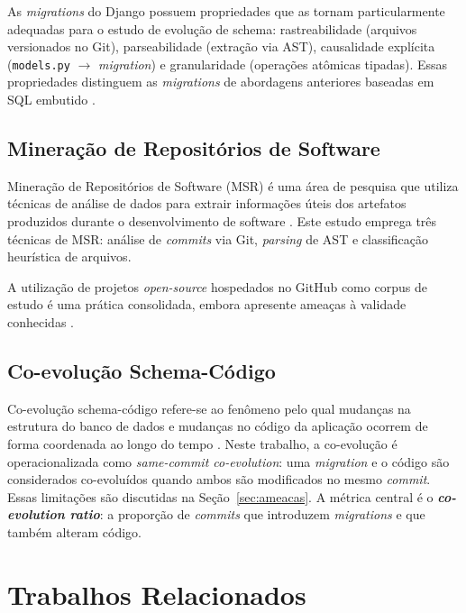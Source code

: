\documentclass[
  12pt,
  openright,
  oneside,
  a4paper,
  brazil
]{abntex2}
\begin{document}
As \textit{migrations} do Django possuem propriedades que as tornam particularmente adequadas para o estudo de evolução de schema: rastreabilidade (arquivos versionados no Git), parseabilidade (extração via AST), causalidade explícita (\texttt{models.py} $\rightarrow$ \textit{migration}) e granularidade (operações atômicas tipadas). Essas propriedades distinguem as \textit{migrations} de abordagens anteriores baseadas em SQL embutido \cite{qiu2013}.

\section{Mineração de Repositórios de Software}

Mineração de Repositórios de Software (MSR) é uma área de pesquisa que utiliza técnicas de análise de dados para extrair informações úteis dos artefatos produzidos durante o desenvolvimento de software \cite{hassan2008}. Este estudo emprega três técnicas de MSR: análise de \textit{commits} via Git, \textit{parsing} de AST e classificação heurística de arquivos.

A utilização de projetos \textit{open-source} hospedados no GitHub como corpus de estudo é uma prática consolidada, embora apresente ameaças à validade conhecidas \cite{kalliamvakou2014}.

\section{Co-evolução Schema-Código}

Co-evolução schema-código refere-se ao fenômeno pelo qual mudanças na estrutura do banco de dados e mudanças no código da aplicação ocorrem de forma coordenada ao longo do tempo \cite{qiu2013}. Neste trabalho, a co-evolução é operacionalizada como \textit{same-commit co-evolution}: uma \textit{migration} e o código são considerados co-evoluídos quando ambos são modificados no mesmo \textit{commit}. Essas limitações são discutidas na Seção~\ref{sec:ameacas}. A métrica central é o \textbf{\textit{co-evolution ratio}}: a proporção de \textit{commits} que introduzem \textit{migrations} e que também alteram código.


\chapter{Trabalhos Relacionados}\label{chap:relacionados}
\end{document}
